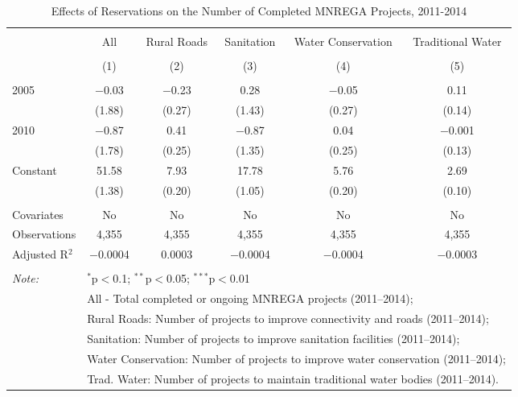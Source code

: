 
\begin{table}[!htbp] \centering 
  \caption{Effects of Reservations on the Number of Completed MNREGA Projects, 2011-2014} 
  \label{main_mnrega} 
\scriptsize 
\begin{tabular}{@{\extracolsep{0pt}}lccccc} 
\\[-1.8ex]\hline 
\hline \\[-1.8ex] 
 & All & Rural Roads & Sanitation & Water Conservation & Traditional Water \\ 
\\[-1.8ex] & (1) & (2) & (3) & (4) & (5)\\ 
\hline \\[-1.8ex] 
 2005 & $-$0.03 & $-$0.23 & 0.28 & $-$0.05 & 0.11 \\ 
  & (1.88) & (0.27) & (1.43) & (0.27) & (0.14) \\ 
  2010 & $-$0.87 & 0.41 & $-$0.87 & 0.04 & $-$0.001 \\ 
  & (1.78) & (0.25) & (1.35) & (0.25) & (0.13) \\ 
  Constant & 51.58 & 7.93 & 17.78 & 5.76 & 2.69 \\ 
  & (1.38) & (0.20) & (1.05) & (0.20) & (0.10) \\ 
 \hline \\[-1.8ex] 
Covariates & No & No & No & No & No \\ 
Observations & 4,355 & 4,355 & 4,355 & 4,355 & 4,355 \\ 
Adjusted R$^{2}$ & $-$0.0004 & 0.0003 & $-$0.0004 & $-$0.0004 & $-$0.0003 \\ 
\hline 
\hline \\[-1.8ex] 
\textit{Note:}  & \multicolumn{5}{l}{$^{*}$p$<$0.1; $^{**}$p$<$0.05; $^{***}$p$<$0.01} \\ 
 & \multicolumn{5}{l}{All - Total completed or ongoing MNREGA projects (2011--2014);} \\ 
 & \multicolumn{5}{l}{Rural Roads: Number of projects to improve connectivity and roads (2011--2014);} \\ 
 & \multicolumn{5}{l}{Sanitation:  Number of projects to improve sanitation facilities  (2011--2014);} \\ 
 & \multicolumn{5}{l}{Water Conservation: Number of projects to improve water conservation (2011--2014);} \\ 
 & \multicolumn{5}{l}{Trad. Water: Number of projects to maintain traditional water bodies (2011--2014).} \\ 
\end{tabular} 
\end{table} 
